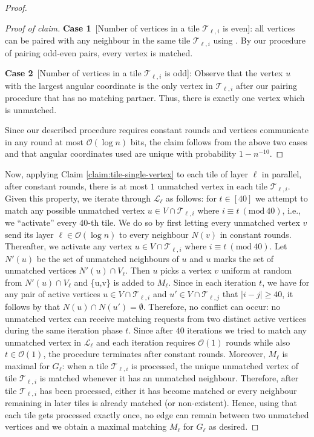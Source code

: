 \documentclass[letterpaper,11pt]{article}
\newcommand{\1}{\mathbb I}
\newcommand{\bigO}{\mathcal{O}}
\newcommand{\Layer}[1]{\mathcal{L}_{#1}}
\newcommand{\tiletile}[2]{\mathcal{T}_{#1,#2}}
\begin{document}
\begin{proof}
{\begin{proof}[Proof of claim]
\textbf{Case 1}~[Number of vertices in a tile $\tiletile{\ell}{i}$ is even]: all vertices can be paired with any neighbour in the same tile $\tiletile{\ell}{i}$ using . By our procedure of pairing odd-even pairs, every vertex is matched. 

\smallskip

\textbf{Case 2}~[Number of vertices in a tile $\tiletile{\ell}{i}$ is odd]: Observe that the vertex $u$ with the largest angular coordinate is the only vertex in $\tiletile{\ell}{i}$ after our pairing procedure that has no matching partner. Thus, there is exactly one vertex which is unmatched.

\smallskip

Since our described procedure requires constant rounds and vertices communicate in any round at most $\bigO(\log n)$ bits, the claim follows from the above two cases and that angular coordinates used are unique with probability $1 - n^{-10}$.
\end{proof}}
%
Now, applying Claim \ref{claim:tile-single-vertex} to each tile of layer $\ell$ in parallel, after constant rounds, there is at most $1$ unmatched vertex in each tile $\tiletile{\ell}{i}$. Given this property, we iterate through $\Layer{\ell}$ as follows: for $t \in [40]$ we attempt to match any possible unmatched vertex $u \in V \cap \tiletile{\ell}{i}$ where  $i \equiv t \ (\mathrm{mod}\ 40)$, i.e., we ``activate'' every 40-th tile. We do so by first letting every unmatched vertex $v$ send its layer $\ell \in \bigO(\log n)$ to every neighbour $N(v)$ in constant rounds. Thereafter, we activate any vertex $u \in V \cap \tiletile{\ell}{i}$ where $i \equiv t \ (\mathrm{mod}\ 40)$. Let $N'(u)$ be the set of unmatched neighbours of $u$ and $u$ marks the set of unmatched vertices $N'(u) \cap V_{\ell}$. Then $u$ picks a vertex $v$ uniform at random from $N'(u) \cap V_{\ell}$ and \{u,v\} is added to $M_{\ell}$. Since in each iteration $t$, we have for any pair of active vertices $u  \in V \cap \tiletile{\ell}{i}$ and $u' \in V \cap \tiletile{\ell}{j}$ that $|i-j|\geq 40$, it follows by  that $N(u) \cap N(u') = \emptyset$. Therefore, no conflict can occur: no unmatched vertex can receive matching requests from two distinct active vertices during the same iteration phase $t$. Since after $40$ iterations we tried to match any unmatched vertex in $\Layer{\ell}$ and each iteration requires $\bigO(1)$ rounds while also $t \in \bigO(1)$, the procedure terminates after constant rounds. Moreover, $M_{\ell}$ is maximal for $G_{\ell}$: when a tile $\tiletile{\ell}{i}$ is processed, the unique unmatched vertex of tile $\tiletile{\ell}{i}$ is matched whenever it has an unmatched neighbour. Therefore, after tile $\tiletile{\ell}{i}$ has been processed, either it has become matched or every neighbour remaining in later tiles is already matched (or non-existent). Hence, using that each tile gets processed exactly once, no edge can remain between two unmatched vertices and we obtain a maximal matching $M_{\ell}$ for $G_{\ell}$ as desired.  
\end{proof}
\end{document}
